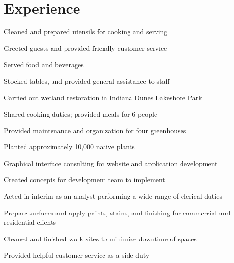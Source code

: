 \documentclass[]{resume-openfont}
\begin{document}
\begin{minipage}[t]{0.66\textwidth} 


\section{Experience}

\vspace{\topsep} %
\begin{tightemize}
\item Cleaned and prepared utensils for cooking and serving
\item Greeted guests and provided friendly customer service
\item Served food and beverages
\item Stocked tables, and provided general assistance to staff
\end{tightemize}
\sectionsep

\begin{tightemize}
\item Carried out wetland restoration in Indiana Dunes Lakeshore Park
\item Shared cooking duties; provided meals for 6 people
\item Provided maintenance and organization for four greenhouses
\item Planted approximately 10,000 native plants
\end{tightemize}
\sectionsep

\begin{tightemize}
\item Graphical interface consulting for website and application development
\item Created concepts for development team to implement
\item Acted in interim as an analyst performing a wide range of clerical duties
\end{tightemize}
\sectionsep

\begin{tightemize}
\item Prepare surfaces and apply paints, stains, and finishing for commercial and residential clients
\item Cleaned and finished work sites to minimize downtime of spaces
\item Provided helpful customer service as a side duty
\end{tightemize}
\sectionsep


\end{minipage}
\end{document}
